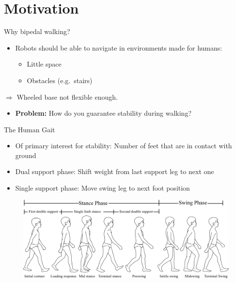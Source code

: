 \section{Motivation}\label{motivation}

\begin{frame}{Why bipedal walking?}

\begin{itemize}
\itemsep1pt\parskip0pt
\item
  Robots should be able to navigate in environments made for humans:

  \begin{itemize}
  \itemsep1pt\parskip0pt
  \item
    Little space
  \item
    Obstacles (e.g.~stairs)
  \end{itemize}
\end{itemize}

\(\Rightarrow\) Wheeled base not flexible enough.

\begin{itemize}
\itemsep1pt\parskip0pt
\item
  \textbf{Problem:} How do you guarantee stability during walking?
\end{itemize}

\end{frame}

\begin{frame}{The Human Gait}

\begin{itemize}
\itemsep1pt\parskip0pt
\item
  Of primary interest for stability: Number of feet that are in contact
  with ground
\item
  Dual support phase: Shift weight from last support leg to next one
\item
  Single support phase: Move swing leg to next foot position
\end{itemize}

\begin{figure}[b]
\includegraphics[width=\textwidth,resolution=300]{images/human_gait.png}
\end{figure}

\end{frame}

